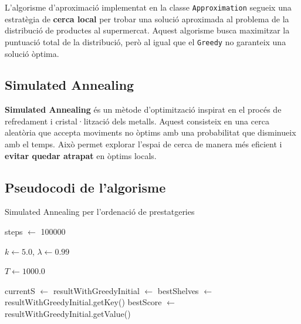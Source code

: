 \documentclass[a4paper,12pt]{report}
\begin{document}
\begin{itemize}
L'algorisme d'aproximació implementat en la classe \texttt{Approximation} segueix una estratègia de \textbf{cerca local} per trobar una solució aproximada al problema de la distribució de productes al supermercat. Aquest algorisme busca maximitzar la puntuació total de la distribució, però al igual que el \texttt{Greedy} no garanteix una solució òptima.

\subsection{Simulated Annealing}
\textbf{Simulated Annealing} és un mètode d'optimització inspirat en el procés de refredament i cristal·lització dels metalls. Aquest consisteix en una cerca aleatòria que accepta moviments no òptims amb una probabilitat que disminueix amb el temps. Això permet explorar l'espai de cerca de manera més eficient i \textbf{evitar quedar atrapat} en òptims locals.

\subsection{Pseudocodi de l'algorisme}
\begin{algorithm}[H]
	\SetAlgoVlined
	\caption{Simulated Annealing per l'ordenació de prestatgeries}
  
  
  
	steps $\leftarrow$ 100000\;
  
	$k \leftarrow 5.0$, $\lambda \leftarrow 0.99$\;
  
	$T \leftarrow 1000.0$\;
  
	currentS $\leftarrow$ \;
	resultWithGreedyInitial $\leftarrow$ \;
	bestShelves $\leftarrow$ resultWithGreedyInitial.getKey()\;
	bestScore $\leftarrow$ resultWithGreedyInitial.getValue()\;


\end{algorithm}
\end{itemize}
\end{document}
